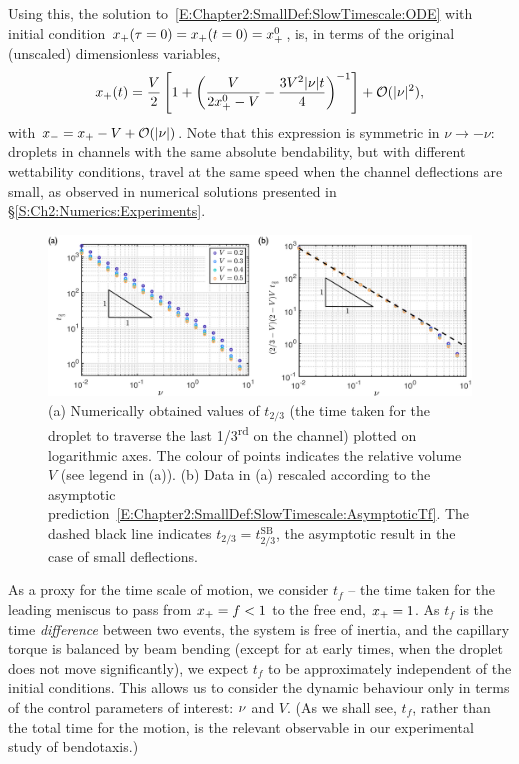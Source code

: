 Using this, the solution to~\eqref{E:Chapter2:SmallDef:SlowTimescale:ODE} with initial condition $x_{+}(\tau = 0) =x_{+}(t = 0) = x_{+}^0$, is, in terms of the original (unscaled) dimensionless variables,
\begin{equation}\label{E:Chapter2:SmallDef:SlowTimescale:xright_original_variables}
x_{+}(t) = \frac{V}{2}\left[1 + \left(\frac{V}{2x_{+}^0 - V} - \frac{3V^2 |\nu | t}{4}\right)^{-1}\right] + \mathcal{O}(|\nu|^2),
\end{equation}
with $x_{-} = x_{+} - V + \mathcal{O}(|\nu|)$. Note that  this expression is symmetric in $\nu \rightarrow -\nu$: droplets in channels with the same absolute bendability, but with different wettability conditions, travel at the same speed when the channel deflections are small, as observed in numerical solutions presented in \S\ref{S:Ch2:Numerics:Experiments}.


\begin{figure}[th]
\centering
\includegraphics[width = \textwidth]{Asymptotics}
\caption{(a) Numerically obtained values of $t_{2/3}$ (the time taken for the droplet to traverse the last 1/3\textsuperscript{rd} on the channel) plotted on logarithmic axes. The colour of points indicates the relative volume $V$ (see legend in (a)). (b) Data in (a) rescaled according to the asymptotic prediction~\eqref{E:Chapter2:SmallDef:SlowTimescale:AsymptoticTf}. The dashed black line indicates $t_{2/3} = t_{2/3}^{\text{SB}}$, the asymptotic result in the case of small deflections.}
\label{fig:Chapter2:SmallDeformations:Asymptotics}
\end{figure}

As a proxy for the time scale of motion, we consider $t_f$ -- the time taken for the leading meniscus to pass from $x_{+} = f < 1$ to the free end, $x_{+} = 1$. As $t_f$ is the time \emph{difference} between two events, the system is free of inertia, and the capillary torque is balanced by beam bending (except for at early times, when the droplet does not move significantly), we expect $t_f$ to be approximately independent of the initial conditions. This allows us to consider the dynamic behaviour only in terms of the control parameters of interest: $\nu$ and $V$. (As we shall see, $t_f$, rather than the total time for the motion, is the relevant observable  in our experimental study of bendotaxis.)

